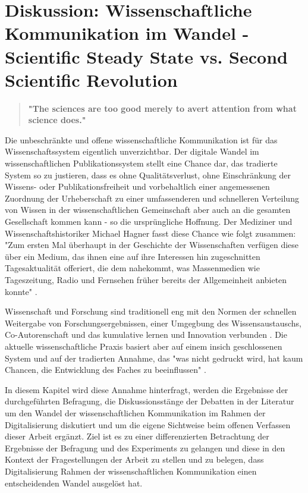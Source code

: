 \chapter{Diskussion: Wissenschaftliche Kommunikation im Wandel - Scientific Steady State vs. Second Scientific Revolution}

\begin{quote}
\textbf{"The sciences are too good merely to avert attention from what science does."}
\end{quote} \cite{kittler_2004}

Die unbeschränkte und offene wissenschaftliche Kommunikation ist für das Wissenschaftssystem eigentlich unverzichtbar. Der digitale Wandel im wissenschaftlichen Publikationssystem stellt eine Chance dar, das tradierte System so zu justieren, dass es ohne Qualitätsverlust, ohne Einschränkung der Wissens- oder Publikationsfreiheit und vorbehaltlich einer angemessenen Zuordnung der Urheberschaft zu einer umfassenderen und schnelleren Verteilung von Wissen in der wissenschaftlichen Gemeinschaft aber auch an die gesamten Gesellschaft kommen kann - so die ursprüngliche Hoffnung. Der Mediziner und Wissenschaftshistoriker Michael Hagner fasst diese Chance wie folgt zusammen: "Zum ersten Mal überhaupt in der Geschichte der Wissenschaften verfügen diese über ein Medium, das ihnen eine auf ihre Interessen hin zugeschnitten Tagesaktualität offeriert, die dem nahekommt, was Massenmedien wie Tageszeitung, Radio und Fernsehen früher bereits der Allgemeinheit anbieten konnte" \cite{hagner_2015_sache_buches}.

Wissenschaft und Forschung sind traditionell eng mit den Normen der schnellen Weitergabe von Forschungsergebnissen, einer Umgegbung des Wissensaustauschs, Co-Autorenschaft und das kumulative lernen und Innovation verbunden \cite{Partha_1994_economics_science}. Die aktuelle wissenschaftliche Praxis basiert aber auf einem insich geschlossenen System und auf der tradierten Annahme, das "was nicht gedruckt wird, hat kaum Chancen, die Entwicklung des Faches zu beeinflussen" \cite{luhmann_1997_gesellschaft}.

In diesem Kapitel wird diese Annahme hinterfragt, werden die Ergebnisse der durchgeführten Befragung, die Diskussionsstänge der Debatten in der Literatur um den Wandel der wissenschaftlichen Kommunikation im Rahmen der Digitalisierung diskutiert und um die eigene Sichtweise beim offenen Verfassen dieser Arbeit ergänzt. Ziel ist es zu einer differenzierten Betrachtung der Ergebnisse der Befragung und des Experiments zu gelangen und diese in den Kontext der Fragestellungen der Arbeit zu stellen und zu belegen, dass Digitalisierung Rahmen der wissenschaftlichen Kommunikation einen entscheidenden Wandel ausgelöst hat.

